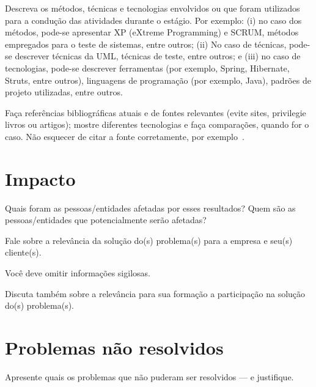 Descreva os métodos, técnicas  e tecnologias
envolvidos  ou que  foram utilizados  para a  condução das  atividades
durante  o estágio.  Por exemplo:  (i)  no caso  dos métodos,  pode-se
apresentar XP (eXtreme Programming) e SCRUM, métodos empregados para o
teste de  sistemas, entre  outros; (ii) No  caso de  técnicas, pode-se
descrever técnicas da UML, técnicas de teste, entre outros; e (iii) no
caso  de  tecnologias,  pode-se descrever  ferramentas  (por  exemplo,
Spring, Hibernate,  Struts, entre  outros), linguagens  de programação
(por exemplo, Java), padrões de projeto utilizadas, entre outros.

Faça  referências bibliográficas  atuais e  de fontes
relevantes  (evite  sites,  privilegie   livros  ou  artigos);  mostre
diferentes  tecnologias e  faça comparações,  quando for  o caso.  Não
esquecer de citar a fonte corretamente, por exemplo~\cite{MichettiJavaMagazine2013}.

\section{Impacto}

Quais foram as pessoas/entidades afetadas por esses resultados? Quem são  as pessoas/entidades que potencialmente serão afetadas?

Fale sobre a relevância da solução do(s) problema(s) para a empresa e seu(s) cliente(s).

Você deve omitir informações sigilosas.

Discuta também sobre a relevância para sua formação a  participação na solução do(s) problema(s).

\section{Problemas não resolvidos}

Apresente quais os problemas que não puderam ser resolvidos --- e justifique.
